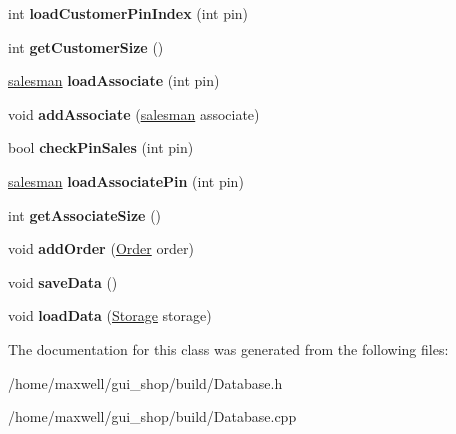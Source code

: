 \begin{DoxyCompactItemize}
\item 
int {\bfseries load\+Customer\+Pin\+Index} (int pin)\hypertarget{classDatabase_a073263cf7a55f9969f71d8f121d1dd15}{}\label{classDatabase_a073263cf7a55f9969f71d8f121d1dd15}

\item 
int {\bfseries get\+Customer\+Size} ()\hypertarget{classDatabase_a42fdd4aec54f0345304a6eb97f3ea887}{}\label{classDatabase_a42fdd4aec54f0345304a6eb97f3ea887}

\item 
\hyperlink{classsalesman}{salesman} {\bfseries load\+Associate} (int pin)\hypertarget{classDatabase_aa2660743a0ee693379942ef661f360fc}{}\label{classDatabase_aa2660743a0ee693379942ef661f360fc}

\item 
void {\bfseries add\+Associate} (\hyperlink{classsalesman}{salesman} associate)\hypertarget{classDatabase_ab2ba6332007153ad13773f059c544ef5}{}\label{classDatabase_ab2ba6332007153ad13773f059c544ef5}

\item 
bool {\bfseries check\+Pin\+Sales} (int pin)\hypertarget{classDatabase_ae116cdba8bec299d5c8a39214355657c}{}\label{classDatabase_ae116cdba8bec299d5c8a39214355657c}

\item 
\hyperlink{classsalesman}{salesman} {\bfseries load\+Associate\+Pin} (int pin)\hypertarget{classDatabase_a38f1909c6dbe12601b0f4fe985887573}{}\label{classDatabase_a38f1909c6dbe12601b0f4fe985887573}

\item 
int {\bfseries get\+Associate\+Size} ()\hypertarget{classDatabase_a290ce3262824a9c8d6ea78326a7172e7}{}\label{classDatabase_a290ce3262824a9c8d6ea78326a7172e7}

\item 
void {\bfseries add\+Order} (\hyperlink{classOrder}{Order} order)\hypertarget{classDatabase_ad5a3b7a09c8ba009dc46c4d8a3e54954}{}\label{classDatabase_ad5a3b7a09c8ba009dc46c4d8a3e54954}

\item 
void {\bfseries save\+Data} ()\hypertarget{classDatabase_a4bfbcd31b36245c9a26b72df1d981e47}{}\label{classDatabase_a4bfbcd31b36245c9a26b72df1d981e47}

\item 
void {\bfseries load\+Data} (\hyperlink{classStorage}{Storage} storage)\hypertarget{classDatabase_a292b82b6274b9b1e50154e76d3d67174}{}\label{classDatabase_a292b82b6274b9b1e50154e76d3d67174}

\end{DoxyCompactItemize}


The documentation for this class was generated from the following files\+:\begin{DoxyCompactItemize}
\item 
/home/maxwell/gui\+\_\+shop/build/Database.\+h\item 
/home/maxwell/gui\+\_\+shop/build/Database.\+cpp\end{DoxyCompactItemize}
